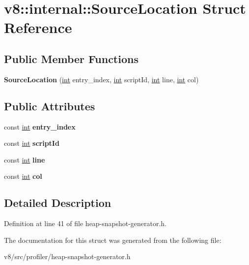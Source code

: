 \hypertarget{structv8_1_1internal_1_1SourceLocation}{}\section{v8\+:\+:internal\+:\+:Source\+Location Struct Reference}
\label{structv8_1_1internal_1_1SourceLocation}
\subsection*{Public Member Functions}
\begin{DoxyCompactItemize}
\item 
\mbox{\label{structv8_1_1internal_1_1SourceLocation_a8a72cd292cbb3d7194611341f00bb3cc}} 
{\bfseries Source\+Location} (\mbox{\hyperlink{classint}{int}} entry\+\_\+index, \mbox{\hyperlink{classint}{int}} script\+Id, \mbox{\hyperlink{classint}{int}} line, \mbox{\hyperlink{classint}{int}} col)
\end{DoxyCompactItemize}
\subsection*{Public Attributes}
\begin{DoxyCompactItemize}
\item 
\mbox{\label{structv8_1_1internal_1_1SourceLocation_a8b542d8cf9e0cdf2061d1139ea71cfe9}} 
const \mbox{\hyperlink{classint}{int}} {\bfseries entry\+\_\+index}
\item 
\mbox{\label{structv8_1_1internal_1_1SourceLocation_aaa44b8ea83d60ac0824ba2c9e4addf87}} 
const \mbox{\hyperlink{classint}{int}} {\bfseries script\+Id}
\item 
\mbox{\label{structv8_1_1internal_1_1SourceLocation_a580c44f2550bf4bf45599986aeed0e1b}} 
const \mbox{\hyperlink{classint}{int}} {\bfseries line}
\item 
\mbox{\label{structv8_1_1internal_1_1SourceLocation_acbcd1934a6f4a11de28786015e3f6ab0}} 
const \mbox{\hyperlink{classint}{int}} {\bfseries col}
\end{DoxyCompactItemize}


\subsection{Detailed Description}


Definition at line 41 of file heap-\/snapshot-\/generator.\+h.



The documentation for this struct was generated from the following file\+:\begin{DoxyCompactItemize}
\item 
v8/src/profiler/heap-\/snapshot-\/generator.\+h\end{DoxyCompactItemize}
